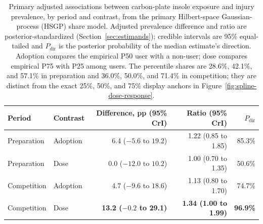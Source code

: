 \begin{table}[htbp]
\centering
\caption{Primary adjusted associations between carbon-plate insole exposure and injury prevalence, by period and contrast, from the primary Hilbert-space Gaussian-process (HSGP) share model. Adjusted prevalence difference and ratio are posterior-standardized (Section~\ref{sec:estimands}); credible intervals are 95\% equal-tailed and $P_{\mathrm{dir}}$ is the posterior probability of the median estimate's direction. Adoption compares the empirical P50 user with a non-user; dose compares empirical P75 with P25 among users. The percentile shares are 28.6\%, 42.1\%, and 57.1\% in preparation and 36.0\%, 50.0\%, and 71.4\% in competition; they are distinct from the exact 25\%, 50\%, and 75\% display anchors in Figure~\ref{fig:spline-dose-response}.}
\label{tab:primary-associations}
\begin{tabular}{llrrr}
\toprule
Period & Contrast & Difference, pp (95\% CrI) & Ratio (95\% CrI) & $P_{\mathrm{dir}}$ \\
\midrule
Preparation & Adoption & 6.4 ($-5.6$ to $19.2$) & 1.22 (0.85 to 1.85) & 85.3\% \\
Preparation & Dose & 0.0 ($-12.0$ to $10.2$) & 1.00 (0.70 to 1.35) & 50.6\% \\
Competition & Adoption & 4.7 ($-9.6$ to $18.6$) & 1.13 (0.80 to 1.70) & 74.7\% \\
Competition & Dose & \textbf{13.2 ($-0.2$ to 29.1)} & \textbf{1.34 (1.00 to 1.99)} & \textbf{96.9\%} \\
\bottomrule
\end{tabular}
\end{table}
